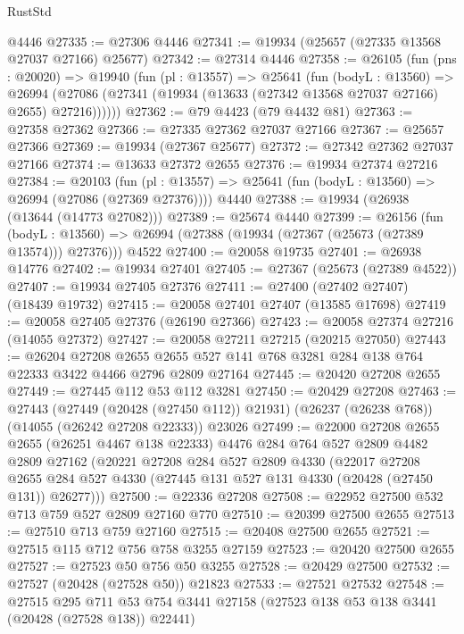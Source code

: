 \begin{lexlean}{RustStd}
\begin{coremodule}
    @4446
@27335 := @27306 @4446
@27341 := @19934 (@25657 (@27335 @13568 @27037 @27166) @25677)
@27342 := @27314 @4446
@27358 := @26105
    (fun (pns : @20020) =>
    @19940
      (fun (pl : @13557) =>
      @25641
        (fun (bodyL : @13560) =>
        @26994 (@27086 (@27341 (@19934 (@13633 (@27342 @13568 @27037 @27166) @2655) @27216))))))
@27362 := @79 @4423 (@79 @4432 @81)
@27363 := @27358 @27362
@27366 := @27335 @27362 @27037 @27166
@27367 := @25657 @27366
@27369 := @19934 (@27367 @25677)
@27372 := @27342 @27362 @27037 @27166
@27374 := @13633 @27372 @2655
@27376 := @19934 @27374 @27216
@27384 := @20103
    (fun (pl : @13557) => @25641 (fun (bodyL : @13560) => @26994 (@27086 (@27369 @27376))))
    @4440
@27388 := @19934 (@26938 (@13644 (@14773 @27082)))
@27389 := @25674 @4440
@27399 := @26156
    (fun (bodyL : @13560) => @26994 (@27388 (@19934 (@27367 (@25673 (@27389 @13574))) @27376)))
    @4522
@27400 := @20058 @19735
@27401 := @26938 @14776
@27402 := @19934 @27401
@27405 := @27367 (@25673 (@27389 @4522))
@27407 := @19934 @27405 @27376
@27411 := @27400 (@27402 @27407) (@18439 @19732)
@27415 := @20058 @27401 @27407 (@13585 @17698)
@27419 := @20058 @27405 @27376 (@26190 @27366)
@27423 := @20058 @27374 @27216 (@14055 @27372)
@27427 := @20058 @27211 @27215 (@20215 @27050)
@27443 := @26204
    @27208
    @2655
    @2655
    @527
    @141
    @768
    @3281
    @284
    @138
    @764
    @22333
    @3422
    @4466
    @2796
    @2809
    @27164
@27445 := @20420 @27208 @2655
@27449 := @27445 @112 @53 @112 @3281
@27450 := @20429 @27208
@27463 := @27443
    (@27449 (@20428 (@27450 @112)) @21931)
    (@26237 (@26238 @768))
    (@14055 (@26242 @27208 @22333))
    @23026
@27499 := @22000
    @27208
    @2655
    @2655
    (@26251 @4467 @138 @22333)
    @4476
    @284
    @764
    @527
    @2809
    @4482
    @2809
    @27162
    (@20221
      @27208
      @284
      @527
      @2809
      @4330
      (@22017
        @27208
        @2655
        @284
        @527
        @4330
        (@27445 @131 @527 @131 @4330 (@20428 (@27450 @131)) @26277)))
@27500 := @22336 @27208
@27508 := @22952 @27500 @532 @713 @759 @527 @2809 @27160 @770
@27510 := @20399 @27500 @2655
@27513 := @27510 @713 @759 @27160
@27515 := @20408 @27500 @2655
@27521 := @27515 @115 @712 @756 @758 @3255 @27159
@27523 := @20420 @27500 @2655
@27527 := @27523 @50 @756 @50 @3255
@27528 := @20429 @27500
@27532 := @27527 (@20428 (@27528 @50)) @21823
@27533 := @27521 @27532
@27548 := @27515
    @295
    @711
    @53
    @754
    @3441
    @27158
    (@27523 @138 @53 @138 @3441 (@20428 (@27528 @138)) @22441)

\end{coremodule}
\end{lexlean}
